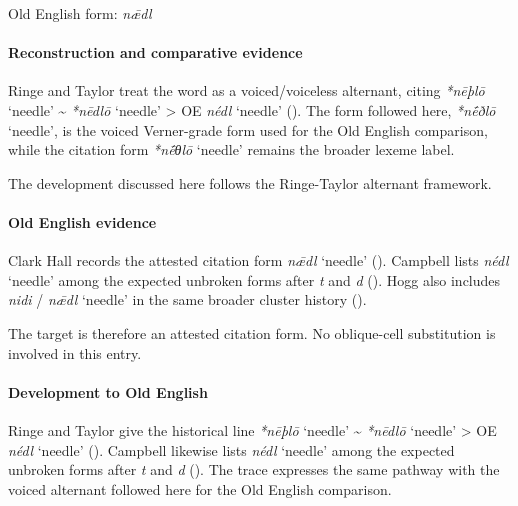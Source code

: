 \documentclass[
  british,
  a4paper,
]{article}
\providecommand{\Recon}[1]{\emph{*#1}}
\begin{document}
Old English form: \emph{nǣdl}

\paragraph{Reconstruction and comparative
evidence}\label{reconstruction-and-comparative-evidence-107}

Ringe and Taylor treat the word as a voiced/voiceless alternant, citing
\Recon{nēþlō} `needle' \textasciitilde{} \Recon{nēdlō} `needle'
\textgreater{} OE \emph{nédl} `needle'
(). The form
followed here, \Recon{nḗðlō} `needle', is the voiced Verner-grade form
used for the Old English comparison, while the citation form
\Recon{nḗθlō} `needle' remains the broader lexeme label.

The development discussed here follows the Ringe-Taylor alternant
framework.

\paragraph{Old English evidence}\label{old-english-evidence-109}

Clark Hall records the attested citation form \emph{nǣdl} `needle'
(). Campbell lists
\emph{nédl} `needle' among the expected unbroken forms after \emph{t}
and \emph{d} ().
Hogg also includes \emph{nidi} / \emph{nǣdl} `needle' in the same
broader cluster history ().

The target is therefore an attested citation form. No oblique-cell
substitution is involved in this entry.

\paragraph{Development to Old
English}\label{development-to-old-english-107}

Ringe and Taylor give the historical line \Recon{nēþlō} `needle'
\textasciitilde{} \Recon{nēdlō} `needle' \textgreater{} OE \emph{nédl}
`needle' ().
Campbell likewise lists \emph{nédl} `needle' among the expected unbroken
forms after \emph{t} and \emph{d} (). The trace expresses the same pathway with the voiced
alternant followed here for the Old English comparison.
\end{document}
